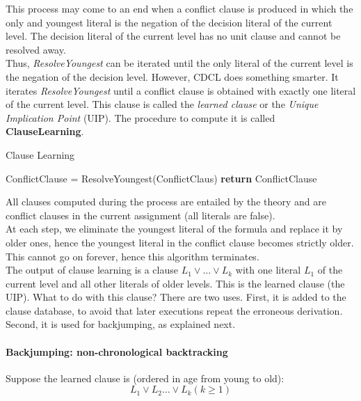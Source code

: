 \documentclass[10pt,a4paper]{article}
\theoremstyle{definition}
\begin{document}
This process may come to an end when a conflict clause is produced in which the only and youngest literal is the negation of the decision literal of the current level. The decision literal of the current level has no unit clause and cannot be resolved away.\\

Thus, \textit{ResolveYoungest} can be iterated until the only literal of the current level is the negation of the decision level. However, CDCL does something smarter. It iterates \textit{ResolveYoungest} until a conflict clause is obtained with exactly one literal of the current level. This clause is called the \textit{learned clause} or the \textit{Unique Implication Point} (UIP). The procedure to compute it is called \textbf{ClauseLearning}. \\

\begin{algorithm}
\caption{Clause Learning}
\begin{algorithmic}[1]
        \State ConflictClause = ResolveYoungest(ConflictClaus)
    \EndWhile
    \State \textbf{return} ConflictClause
\EndProcedure
\end{algorithmic}
\end{algorithm}

All clauses computed during the process are entailed by the theory and are conflict clauses in the current assignment (all literals are false). \\

At each step, we eliminate the youngest literal of the formula and replace it by older ones, hence the youngest literal in the conflict clause becomes strictly older. This cannot go on forever, hence this algorithm terminates. \\

The output of clause learning is a clause $L_1 \lor \dots \lor L_k$ with one literal $L_1$ of the current level and all other literals of older levels. This is the learned clause (the UIP). What to do with this clause? There are two uses. First, it is added to the clause database, to avoid that later executions repeat the erroneous derivation. Second, it is used for backjumping, as explained next.

\paragraph{Backjumping: non-chronological backtracking} Suppose the learned clause is (ordered in age from young to old): $$L_1 \lor L_2 \dots \lor L_k(k\geq 1)$$
\end{document}
